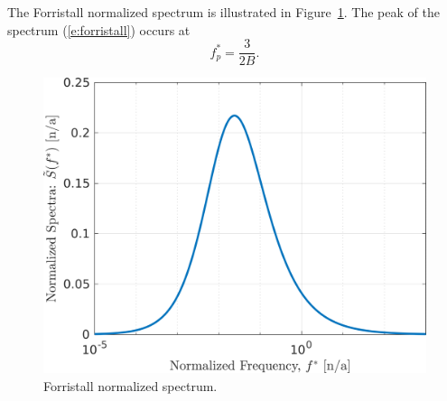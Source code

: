 \documentclass[utf8]{frontiersSCNS} %
\begin{document}
The Forristall normalized spectrum is illustrated in Figure~\ref{f:forristall_norm}.  The peak of the spectrum (\ref{e:forristall}) occurs at
\begin{equation}
f^*_p = \frac{3}{2B}.
\end{equation}
\begin{figure}[h!]
  \centering
  \includegraphics[width=\SFc\textwidth]{src/forristall_norm.png}
  \caption{Forristall normalized spectrum.}
  \label{f:forristall_norm}
\end{figure}
\end{document}
